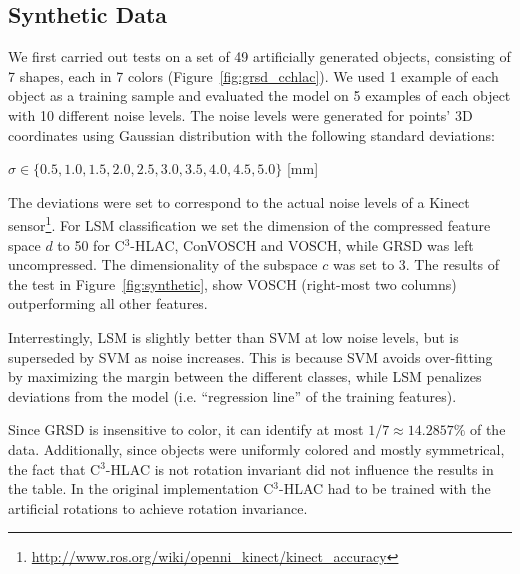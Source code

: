 \documentclass[a4paper, 10 pt, conference]{sty/ieeeconf}
\begin{document}
\subsection{Synthetic Data}
We first carried out tests on a set of 49 artificially generated objects, consisting of
7 shapes, each in 7 colors (Figure~\ref{fig:grsd_cchlac}). We used 1 example of 
each object as a training sample and evaluated the model on 5 examples of each object with 
10 different noise levels. The noise levels were generated for points' 3D coordinates 
using Gaussian distribution with the following standard deviations:
\begin{center}
$\sigma \in \{0.5, 1.0, 1.5, 2.0, 2.5, 3.0, 3.5, 4.0, 4.5, 5.0\}$ [mm]
\end{center}
The deviations were set to correspond to the actual noise levels of a Kinect 
sensor\footnote{\url{http://www.ros.org/wiki/openni_kinect/kinect_accuracy}}.
For LSM classification we set the dimension of the compressed feature space $d$ to 
50 for C$^3$-HLAC, ConVOSCH and VOSCH, while GRSD was left uncompressed. 
The dimensionality of the subspace $c$ was set to 3.
The results of the test in Figure~\ref{fig:synthetic},
show VOSCH (right-most two columns) outperforming all other features.

Interrestingly, LSM is slightly better than SVM at low noise levels, but is superseded
by SVM as noise increases. This is because SVM avoids over-fitting by maximizing the margin
between the different classes, while LSM penalizes deviations from the model
(i.e. ``regression line'' of the training features).


Since GRSD is insensitive to color, it can identify at most $1/7 \approx 14.2857\%$ of the data.
Additionally, since objects were uniformly colored and mostly symmetrical, the fact that C$^3$-HLAC 
is not rotation invariant did not influence the results in the table. In the original implementation C$^3$-HLAC 
had to be trained with the artificial rotations to achieve rotation invariance.
\end{document}
